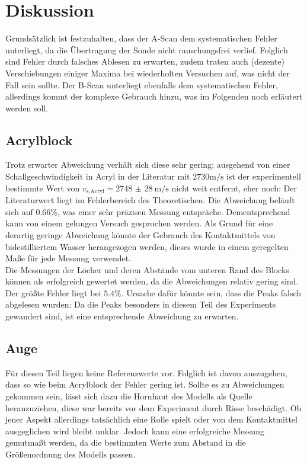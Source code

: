 \section{Diskussion}
\label{sec:Diskussion}

Grundsätzlich ist festzuhalten, dass der A-Scan dem systematischen Fehler 
unterliegt, da die Übertragung der Sonde nicht rauschungsfrei verlief. Folglich 
sind Fehler durch falsches Ablesen zu erwarten, zudem traten auch (dezente) 
Verschiebungen einiger Maxima bei wiederholten Versuchen auf, was nicht der 
Fall sein sollte. Der B-Scan unterliegt ebenfalls dem systematischen Fehler, 
allerdings kommt der komplexe Gebrauch hinzu, was im Folgenden noch erläutert 
werden soll.

\subsection{Acrylblock}
Trotz erwarter Abweichung verhält sich diese sehr gering; ausgehend von einer 
Schallgeschwindigkeit in Acryl in der Literatur mit $2730 \unit{\meter}/\unit{\second}$
\cite{acryl} ist der experimentell bestimmte Wert von $v_\text{s,Acryl} =
\qty{2748(28)}{\meter\per\second}$ nicht weit entfernt, eher noch:
Der Literaturwert liegt im Fehlerbereich des Theoretischen. Die Abweichung 
beläuft sich auf $0.66 \%$, was einer sehr präzisen Messung entspräche. Dementsprechend 
kann von einem gelungen Versuch gesprochen werden. Als Grund für eine derartig geringe 
Abweichung könnte der Gebrauch des Kontaktmittels von bidestilliertem Wasser 
herangezogen werden, dieses wurde in einem geregelten Maße für jede Messung 
verwendet.
\vspace{0.5em}
\\
\noindent Die Messungen der Löcher und deren Abstände vom unteren Rand des 
Blocks können als erfolgreich gewertet werden, da die Abweichungen relativ
gering sind. Der größte Fehler liegt bei $5.4\%$. Ursache dafür könnte sein, 
dass die Peaks falsch abgelesen wurden: Da die Peaks besonders in diesem 
Teil des Experiments gewandert sind, ist eine entsprechende Abweichung zu 
erwarten.

\subsection{Auge}
Für diesen Teil liegen keine Referenzwerte vor. Folglich ist davon auszugehen, 
dass so wie beim Acrylblock der Fehler gering ist. Sollte es zu Abweichungen 
gekommen sein, lässt sich dazu die Hornhaut des Modells als Quelle heranzuziehen, 
diese war bereits vor dem Experiment durch Risse beschädigt. Ob jener Aspekt 
allerdings tatsächlich eine Rolle spielt oder von dem Kontaktmittel ausgeglichen 
wird bleibt unklar. Jedoch kann eine erfolgreiche Messung gemutmaßt werden, da
die bestimmten Werte zum Abstand in die Größenordnung des Modells passen.

